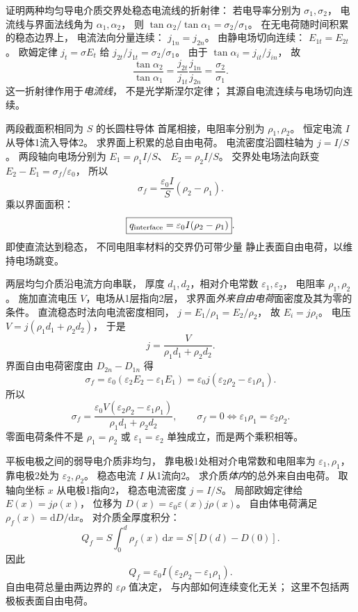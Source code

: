 证明两种均匀导电介质交界处稳态电流线的折射律：
若电导率分别为 $\sigma_1,\sigma_2$，
电流线与界面法线角为 $\alpha_1,\alpha_2$，
则
$\tan\alpha_2/\tan\alpha_1=\sigma_2/\sigma_1$。
\exsolution
在无电荷随时间积累的稳态边界上，
电流法向分量连续：
$j_{1n}=j_{2n}$。
由静电场切向连续：
$E_{1t}=E_{2t}$。
欧姆定律 $j_t=\sigma E_t$ 给
$j_{2t}/j_{1t}=\sigma_2/\sigma_1$。
由于
$\tan\alpha_i=j_{it}/j_{in}$，
故
\[
\frac{\tan\alpha_2}{\tan\alpha_1}
=\frac{j_{2t}}{j_{1t}}
\frac{j_{1n}}{j_{2n}}
=\boxed{\frac{\sigma_2}{\sigma_1}}.
\]
\excheck 这一折射律作用于\emph{电流线}，
不是光学斯涅尔定律；
其源自电流连续与电场切向连续。

两段截面积相同为 $S$ 的长圆柱导体
首尾相接，电阻率分别为 $\rho_1,\rho_2$。
恒定电流 $I$ 从导体1流入导体2。
求界面上积累的总自由电荷。
\exsolution
电流密度沿圆柱轴为
$j=I/S$。
两段轴向电场分别为
$E_1=\rho_1I/S$、
$E_2=\rho_2I/S$。
交界处电场法向跃变
$E_2-E_1=\sigma_f/\varepsilon_0$，
所以
\[
\sigma_f=\frac{\varepsilon_0 I}{S}
(\rho_2-\rho_1).
\]
乘以界面面积：
\[
\boxed{q_{\rm interface}=
\varepsilon_0 I(\rho_2-\rho_1)}.
\]
\excheck 即使直流达到稳态，
不同电阻率材料的交界仍可带少量
静止表面自由电荷，以维持电场跳变。

两层均匀介质沿电流方向串联，
厚度 $d_1,d_2$，相对介电常数
$\varepsilon_1,\varepsilon_2$，
电阻率 $\rho_1,\rho_2$。
施加直流电压 $V$，电场从1层指向2层，
求界面\emph{外来自由电荷}面密度及其为零的条件。
\exsolution
直流稳态时法向电流密度相同，
$j=E_1/\rho_1=E_2/\rho_2$，
故 $E_i=j\rho_i$。
电压
$V=j(\rho_1d_1+\rho_2d_2)$，
于是
\[
j=\frac{V}{\rho_1d_1+\rho_2d_2}.
\]
界面自由电荷密度由
$D_{2n}-D_{1n}$ 得
\[
\sigma_f=\varepsilon_0
(\varepsilon_2E_2-\varepsilon_1E_1)
=\varepsilon_0j
(\varepsilon_2\rho_2-\varepsilon_1\rho_1).
\]
所以
\[
\boxed{\sigma_f=
\frac{\varepsilon_0V
(\varepsilon_2\rho_2-\varepsilon_1\rho_1)}
{\rho_1d_1+\rho_2d_2}},
\qquad
\boxed{\sigma_f=0\iff
\varepsilon_1\rho_1=\varepsilon_2\rho_2}.
\]
\excheck 零面电荷条件不是
$\rho_1=\rho_2$ 或 $\varepsilon_1=\varepsilon_2$
单独成立，而是两个乘积相等。

平板电极之间的弱导电介质非均匀，
靠电极1处相对介电常数和电阻率为
$\varepsilon_1,\rho_1$，
靠电极2处为 $\varepsilon_2,\rho_2$。
稳态电流 $I$ 从1流向2。
求介质\emph{体内}的总外来自由电荷。
\exsolution
取轴向坐标 $x$ 从电极1指向2，
稳态电流密度 $j=I/S$。
局部欧姆定律给 $E(x)=j\rho(x)$，
位移为
$D(x)=\varepsilon_0\varepsilon(x)j\rho(x)$。
自由体电荷满足
$\rho_f(x)=\mathrm dD/\mathrm dx$。
对介质全厚度积分：
\[
Q_f=S\int_0^d\rho_f(x)\,\mathrm dx
=S[D(d)-D(0)].
\]
因此
\[
\boxed{Q_f=
\varepsilon_0I
(\varepsilon_2\rho_2-\varepsilon_1\rho_1)}.
\]
\excheck 自由电荷总量由两边界的
$\varepsilon\rho$ 值决定，
与内部如何连续变化无关；
这里不包括两极板表面自由电荷。

